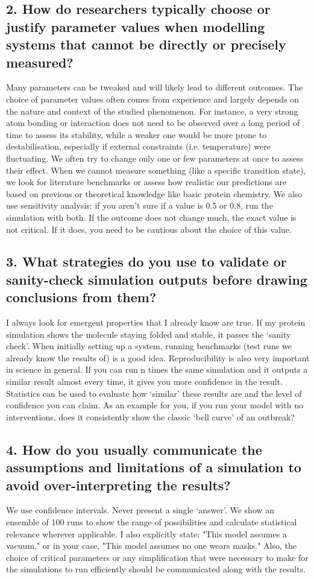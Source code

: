 \subsection*{2. How do researchers typically choose or justify parameter values when modelling systems that cannot be directly or precisely measured?}
Many parameters can be tweaked and will likely lead to different outcomes. The choice of parameter values often comes from experience and largely depends on the nature and context of the studied phenomenon. For instance, a very strong atom bonding or interaction does not need to be observed over a long period of time to assess its stability, while a weaker one would be more prone to destabilisation, especially if external constraints (i.e. temperature) were fluctuating. We often try to change only one or few parameters at once to assess their effect. When we cannot measure something (like a specific transition state), we look for literature benchmarks or assess how realistic our predictions are based on previous or theoretical knowledge like basic protein chemistry. We also use sensitivity analysis: if you aren't sure if a value is 0.5 or 0.8, run the simulation with both. If the outcome does not change much, the exact value is not critical. If it does, you need to be cautious about the choice of this value.

\subsection*{3. What strategies do you use to validate or sanity-check simulation outputs before drawing conclusions from them?}
I always look for emergent properties that I already know are true. If my protein simulation shows the molecule staying folded and stable, it passes the ‘sanity check’. When initially setting up a system, running benchmarks (test runs we already know the results of) is a good idea. Reproducibility is also very important in science in general. If you can run n times the same simulation and it outputs a similar result almost every time, it gives you more confidence in the result. Statistics can be used to evaluate how ‘similar’ these results are and the level of confidence you can claim. As an example for you, if you run your model with no interventions, does it consistently show the classic ‘bell curve’ of an outbreak?

\subsection*{4. How do you usually communicate the assumptions and limitations of a simulation to avoid over-interpreting the results?}
We use confidence intervals. Never present a single ‘answer’. We show an ensemble of 100 runs to show the range of possibilities and calculate statistical relevance wherever applicable. I also explicitly state: "This model assumes a vacuum," or in your case, "This model assumes no one wears masks." Also, the choice of critical parameters or any simplification that were necessary to make for the simulations to run efficiently should be communicated along with the results.

